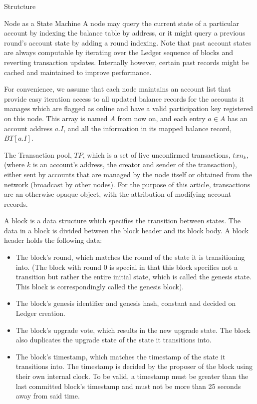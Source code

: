 \documentclass[10pt,a4paper]{article}
\begin{document}
\begin{section}{Strutcture}
\begin{subsection}{Node as a State Machine}
A node may query the current state of a particular account by indexing the balance 
table by address, or it might query a previous round's account state by adding a 
round indexing. 
Note that past account states are always computable by iterating over the Ledger
sequence of blocks and reverting transaction updates. Internally however, certain
past records might be cached and maintained to improve performance.

For convenience, we assume that each node maintains an account list that provide 
easy iteration access to all updated balance records for the accounts it manages 
which are flagged as online and have a valid participation key registered on this
node. 
This array is named $A$ from now on, and each entry $a\in A$ has an account address 
$a.I$, and all the information in its mapped balance record, $BT[a.I]$.

The Transaction pool, $TP$, which is a set of live unconfirmed transactions, $txn_k$, (where 
$k$ is an account's address, the creator and sender of the transaction), either
sent by accounts that are managed by the node itself or obtained from the network 
(broadcast by other nodes).
For the purpose of this article, transactions are an otherwise opaque object, with the 
attribution of modifying account records.

A {\sf block} is a data structure which specifies the transition between states.
The data in a block is divided between the block header and its block body.
A block header holds the following data:
\begin{itemize}
    \item
    The block's round, which matches the round of the state it is transitioning
    into. (The block with round 0 is special in that this block specifies not
    a transition but rather the entire initial state, which is called the genesis
    state. This block is correspondingly called the genesis block).
    
    \item
    The block's genesis identifier and genesis hash, constant and decided on
    Ledger creation.
    
    \item
    The block's upgrade vote, which results in the new upgrade state. The
    block also duplicates the upgrade state of the state it transitions into.
    
    \item
    The block's timestamp, which matches the timestamp of the state it transitions into. 
    The timestamp is decided by the proposer of the block using their own internal clock. 
    To be valid, a timestamp must be greater than the last committed block's timestamp 
    and must not be more than 25 seconds away from said time.
    

\end{itemize}
\end{subsection}
\end{section}
\end{document}
